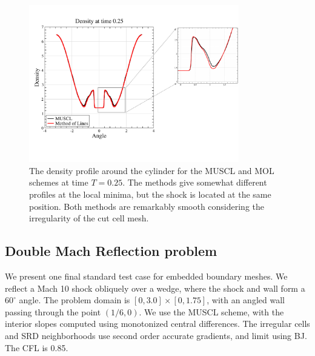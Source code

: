 \begin{figure}[h]
\centering
\hspace*{-.2in}
\includegraphics[height=2.7in]{figs/MM_densityBndry.pdf}
\hspace*{.3in}
\caption{\sf The density profile  around the cylinder for the MUSCL and MOL schemes 
at time $T=0.25$.  The methods give somewhat different profiles at the
local minima, but the shock is  located at the same position.
Both methods  are remarkably smooth considering the
irregularity of the cut cell mesh.}
\label{fig:cylbndry}
\end{figure}

\clearpage

\subsection{Double Mach Reflection problem}\label{sec:dm}
We present one final standard test case for embedded
boundary meshes. We reflect a Mach 10 shock obliquely over a wedge, 
where the shock and wall form a $60^{\circ}$ angle.  
The problem domain is $[0,3.0]\times[0,1.75]$, with an angled wall 
passing through the point $(1/6,0)$. 
We use the MUSCL scheme, with the interior slopes 
computed using monotonized central differences. The irregular cells and
SRD neighborhoods use second order accurate 
gradients, and limit using BJ.
The CFL is 0.85.


